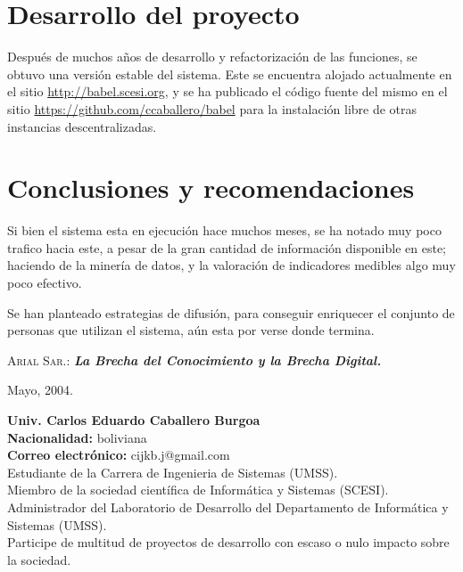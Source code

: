 \documentclass[letter,11pt,oneside,spanish]{article}
\begin{document}
\section{Desarrollo del proyecto}
Después de muchos años de desarrollo y refactorización de las funciones, se
obtuvo una versión estable del sistema. Este se encuentra alojado actualmente
en el sitio \url{http://babel.scesi.org}, y se ha publicado el código fuente del
mismo en el sitio \url{https://github.com/ccaballero/babel} para la instalación
libre de otras instancias descentralizadas.

\section{Conclusiones y recomendaciones}
Si bien el sistema esta en ejecución hace muchos meses, se ha notado muy poco
trafico hacia este, a pesar de la gran cantidad de información disponible en
este; haciendo de la minería de datos, y la valoración de indicadores medibles
algo muy poco efectivo.

Se han planteado estrategias de difusión, para conseguir enriquecer el conjunto
de personas que utilizan el sistema, aún esta por verse donde termina.

\newpage
\begin{thebibliography}{99}
        \textsc{Arial Sar.:}
        \textit{\textbf{La Brecha del Conocimiento y la Brecha Digital.}}
        \par Mayo, 2004.
\end{thebibliography}

\newpage
\begin{figure}
\end{figure}

\textbf{Univ. Carlos Eduardo Caballero Burgoa}\\
\textbf{Nacionalidad:} boliviana\\
\textbf{Correo electrónico:} cijkb.j@gmail.com\\
Estudiante de la Carrera de Ingenieria de Sistemas (UMSS).\\
Miembro de la sociedad científica de Informática y Sistemas (SCESI).\\
Administrador del Laboratorio de Desarrollo del Departamento de Informática y Sistemas (UMSS).\\
Participe de multitud de proyectos de desarrollo con escaso o nulo impacto sobre la sociedad.
\end{document}
